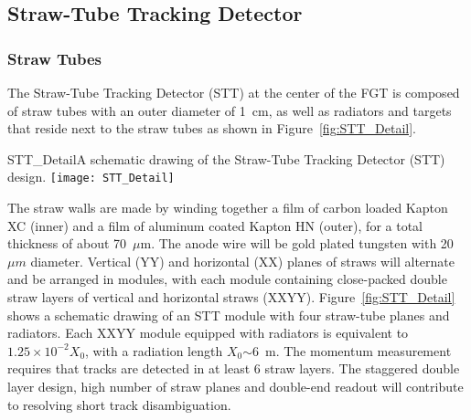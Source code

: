 


\subsection{Straw-Tube Tracking Detector}
\label{cdrsec:detectors-nd-ref-fgt-stt}


\subsubsection{Straw Tubes} 

The Straw-Tube Tracking Detector (STT) at the center of the FGT 
is composed of straw tubes with an outer diameter of 1~cm, as well as 
radiators and targets that reside next to the straw tubes as shown in Figure~\ref{fig:STT_Detail}.
\begin{cdrfigure}
{STT_Detail}{A schematic drawing of the Straw-Tube Tracking Detector (STT) design.}
\texttt{[image: STT\_Detail]}
\end{cdrfigure}

The straw walls are made by winding together a film of carbon loaded
Kapton XC (inner) and a film of aluminum coated Kapton HN (outer), for
a total thickness of about 70~$\mu$m. The anode wire will be gold plated 
tungsten with 20 $\mu m$ diameter. Vertical (YY) and horizontal
(XX) planes of straws will alternate and be arranged in modules, with
each module containing close-packed double straw layers of vertical
and horizontal straws (XXYY).  Figure~\ref{fig:STT_Detail} shows a
schematic drawing of an STT module with four straw-tube planes and
radiators. Each XXYY module equipped with radiators is equivalent to
$1.25 \times 10^{-2} X_0$, with a radiation length $X_0$$\sim$6~m. The
momentum measurement requires that tracks are detected in at least 6
straw layers. The staggered double layer design, high 
number of straw planes and double-end readout
will contribute to resolving short track disambiguation.


